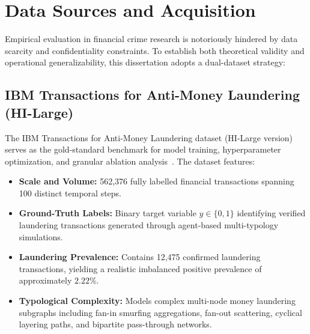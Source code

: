 \section{Data Sources and Acquisition}
Empirical evaluation in financial crime research is notoriously hindered by data scarcity and confidentiality constraints. To establish both theoretical validity and operational generalizability, this dissertation adopts a dual-dataset strategy:

\subsection{IBM Transactions for Anti-Money Laundering (HI-Large)}
The IBM Transactions for Anti-Money Laundering dataset (HI-Large version) serves as the gold-standard benchmark for model training, hyperparameter optimization, and granular ablation analysis~\cite{weber2019anti}. The dataset features:
\begin{itemize}
    \item \textbf{Scale and Volume:} 562,376 fully labelled financial transactions spanning 100 distinct temporal steps.
    \item \textbf{Ground-Truth Labels:} Binary target variable $y \in \{0, 1\}$ identifying verified laundering transactions generated through agent-based multi-typology simulations.
    \item \textbf{Laundering Prevalence:} Contains 12,475 confirmed laundering transactions, yielding a realistic imbalanced positive prevalence of approximately $2.22\%$.
    \item \textbf{Typological Complexity:} Models complex multi-node money laundering subgraphs including fan-in smurfing aggregations, fan-out scattering, cyclical layering paths, and bipartite pass-through networks.
\end{itemize}

